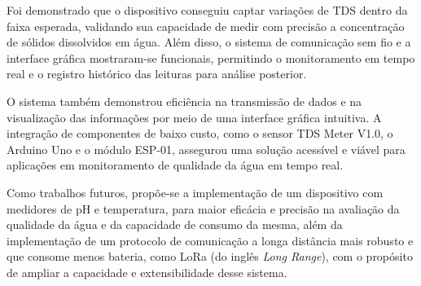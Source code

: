 \documentclass[12pt]{article}
\begin{document}
Foi demonstrado que o dispositivo conseguiu captar variações de TDS dentro da faixa esperada, validando sua capacidade de medir com precisão a concentração de sólidos dissolvidos em água. Além disso, o sistema de comunicação sem fio e a interface gráfica mostraram-se funcionais, permitindo o monitoramento em tempo real e o registro histórico das leituras para análise posterior.

O sistema também demonstrou eficiência na transmissão de dados e na visualização das informações por meio de uma interface gráfica intuitiva. A integração de componentes de baixo custo, como o sensor TDS Meter V1.0, o Arduino Uno e o módulo ESP-01, assegurou uma solução acessível e viável para aplicações em monitoramento de qualidade da água em tempo real.

Como trabalhos futuros, propõe-se a implementação de um dispositivo com medidores de pH e temperatura, para maior eficácia e precisão na avaliação da qualidade da água e da capacidade de consumo da mesma, além da implementação de um protocolo de comunicação a longa distância mais robusto e que consome menos bateria, como LoRa (do inglês \textit{Long Range}), com o propósito de ampliar a capacidade e extensibilidade desse sistema.




\end{document}
